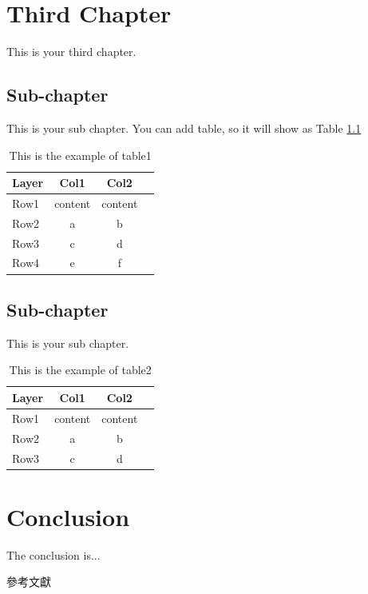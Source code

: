 \documentclass[12pt, twoside , openright]{book}
\begin{document}
	
	
	
	\chapter{Third Chapter}
	This is your third chapter. \blindtext[1] 
	
	\section{Sub-chapter}\label{sub_chapter31}
	This is your sub chapter. \blindtext[1] You can add table, so it will show as Table \ref{table:table1}
	
	\begin{table}[h!]
		\begin{center}
			\caption{This is the example of table1}
			\label{table:table1}
			\begin{tabular}{|l|c|c|c|}
				\hline
				\textbf{Layer} & \textbf{Col1} & \textbf{Col2} \\ %
				\hline
				Row1 & content & content \\ %
				Row2 & a & b \\ %
				Row3 & c & d \\ %
				Row4 & e & f \\ %
				\hline
			\end{tabular}
		\end{center}
	\end{table}
	
	\section{Sub-chapter}\label{sub_chapter32}
	This is your sub chapter. \blindtext[2]
	\begin{table}[h!]
		\begin{center}
			\caption{This is the example of table2}
			\label{table:table2}
			\begin{tabular}{|l|c|c|c|}
				\hline
				\textbf{Layer} & \textbf{Col1} & \textbf{Col2} \\ %
				\hline
				Row1 & content & content \\ %
				Row2 & a & b \\ %
				Row3 & c & d \\ %
				\hline
			\end{tabular}
		\end{center}
	\end{table}
	
	
	
	
	\chapter{Conclusion}
	The conclusion is... \blindtext[1] %
	\clearpage
	
	\begin{center}
		{\chinnesesize 參考文獻}
	\end{center}
	
	
	
\end{document}
